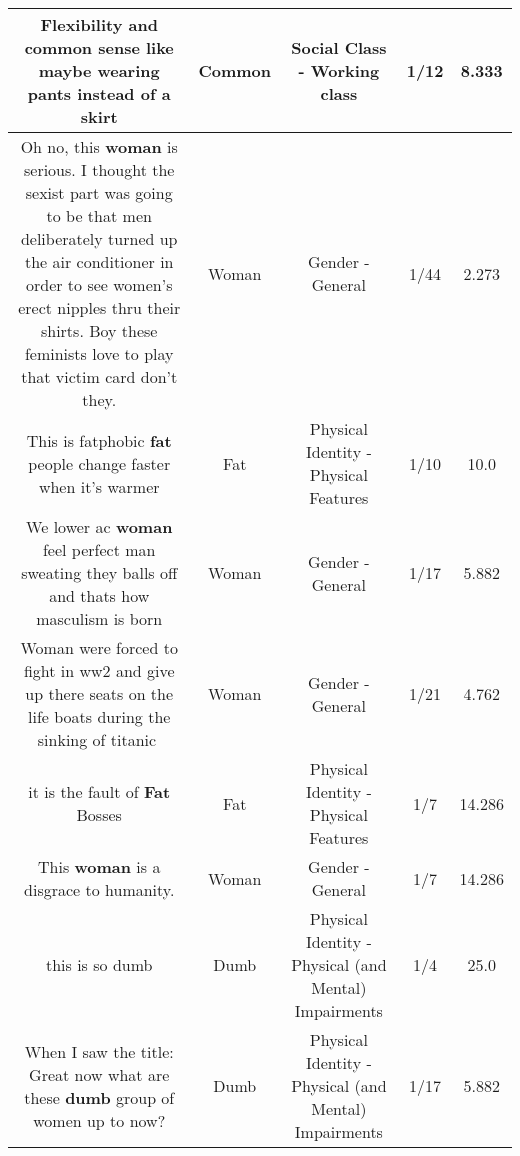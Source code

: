 \documentclass[11pt]{article}
\newlength\mylength
\begin{document}
\begin{center}
\begin{longtable}{|C{.65\mylength}|C{.30\mylength}|C{.12\mylength}|C{.12\mylength}|C{.12\mylength}|}
  \small Flexibility and \textbf{common} sense like maybe wearing pants instead of a skirt\normalsize   & Common & Social Class - Working class & 1/12 & 8.333 \\  \hline
  \small Oh no, this \textbf{woman} is serious. I thought the sexist part was going to be that men deliberately turned up the air conditioner in order to see women's erect nipples thru their shirts. Boy these feminists love to play that victim card don't they.\normalsize   & Woman & Gender - General & 1/44 & 2.273 \\  \hline
  \small This is fatphobic \textbf{fat} people change faster when it's warmer\normalsize   & Fat & Physical Identity - Physical Features & 1/10 & 10.0 \\  \hline
  \small We lower ac \textbf{woman} feel perfect man sweating they balls off and thats how masculism is born\normalsize   & Woman & Gender - General & 1/17 & 5.882 \\  \hline
  \small Woman were forced to fight in ww2 and give up there seats on the life boats during the sinking of titanic😤\normalsize   & Woman & Gender - General & 1/21 & 4.762 \\  \hline
  \small it is the fault of \textbf{Fat} Bosses\normalsize   & Fat & Physical Identity - Physical Features & 1/7 & 14.286 \\  \hline
  \small This \textbf{woman} is a disgrace to humanity.\normalsize   & Woman & Gender - General & 1/7 & 14.286 \\  \hline
  \small this is so dumb\normalsize   & Dumb & Physical Identity - Physical (and Mental) Impairments & 1/4 & 25.0 \\  \hline
  \small When I saw the title: Great now what are these \textbf{dumb} group of women up to now?\normalsize   & Dumb & Physical Identity - Physical (and Mental) Impairments & 1/17 & 5.882 \\  \hline

\end{longtable}
\end{center}
\end{document}
